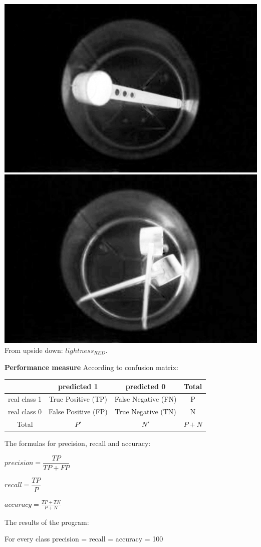 \documentclass[12pt]{article}
\begin{document}
	\includegraphics[width=1\textwidth]{result1}\\
	
	\includegraphics[width=1\textwidth]{result2}\\
	
	From upside down: $lightness_{RED}$.
	\medskip
	
	\textbf{Performance measure}
	According to confusion matrix:
	
	\begin{tabular}{|c||c|c|c|}
		\hline
		\ & predicted 1 & predicted 0 & Total \\
		\hline
		real class 1 & True Positive (TP) & False Negative (FN) & P\\
		\hline
		real class 0 & False Positive (FP) & True Negative (TN) & N \\
		\hline
		Total & $P'$ & $N'$ & $P+N$\\
		\hline 
	\end{tabular}
	\medskip
	
	The formulas for precision, recall and accuracy:
	\begin{list}{)~}{}
		\item $precision = \dfrac{TP}{TP+FP}$
		\item $recall = \dfrac{TP}{P}$
		\item $accuracy = \frac{TP+TN}{P+N}$
	\end{list}
	\newpage
	
	The results of the program:

	For every class precision = recall = accuracy = 100%
	
\end{document}
